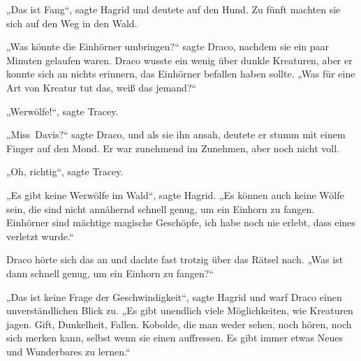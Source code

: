 „Das ist Fang“, sagte Hagrid und deutete auf den Hund. Zu fünft machten sie sich auf den Weg in den Wald.

„Was könnte die Einhörner umbringen?“ sagte Draco, nachdem sie ein paar Minuten gelaufen waren. Draco wusste ein wenig über dunkle Kreaturen, aber er konnte sich an nichts erinnern, das Einhörner befallen haben sollte. „Was für eine Art von Kreatur tut das, weiß das jemand?“

„Werwölfe!“, sagte Tracey.

„Miss~Davis?“ sagte Draco, und als sie ihn ansah, deutete er stumm mit einem Finger auf den Mond. Er war zunehmend im Zunehmen, aber noch nicht voll.

„Oh, richtig“, sagte Tracey.

„Es gibt keine Werwölfe im Wald“, sagte Hagrid. „Es können auch keine Wölfe sein, die sind nicht annähernd schnell genug, um ein Einhorn zu fangen. Einhörner sind mächtige magische Geschöpfe, ich habe noch nie erlebt, dass eines verletzt wurde.“

Draco hörte sich das an und dachte fast trotzig über das Rätsel nach. „Was ist dann schnell genug, um ein Einhorn zu fangen?“

„Das ist keine Frage der Geschwindigkeit“, sagte Hagrid und warf Draco einen unverständlichen Blick zu. „Es gibt unendlich viele Möglichkeiten, wie Kreaturen jagen. Gift, Dunkelheit, Fallen. Kobolde, die man weder sehen, noch hören, noch sich merken kann, selbst wenn sie einen auffressen. Es gibt immer etwas Neues und Wunderbares zu lernen.“

